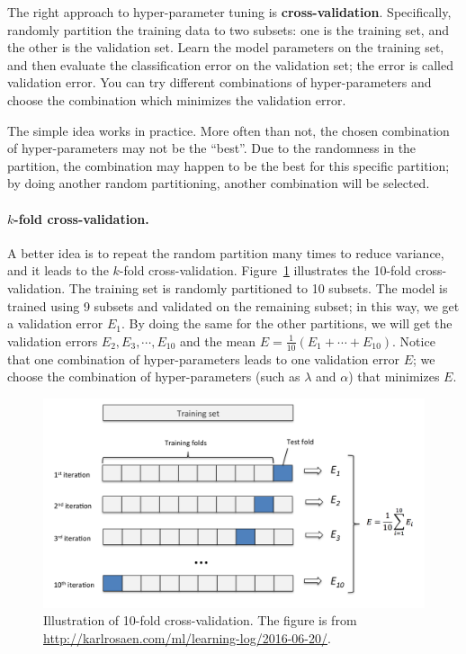 \documentclass[11pt]{article}
\numberwithin{equation}{section}
\begin{document}
The right approach to hyper-parameter tuning is {\bf cross-validation}.
Specifically, randomly partition the training data to two subsets: one is the training set, and the other is the validation set.
Learn the model parameters on the training set, 
and then evaluate the classification error on the validation set;
the error is called validation error.
You can try different combinations of hyper-parameters and choose the combination which minimizes the validation error.



The simple idea works in practice.
More often than not, the chosen combination of hyper-parameters may not be the ``best''.
Due to the randomness in the partition, the combination may happen to be the best for this specific partition;
by doing another random partitioning, another combination will be selected.



\paragraph{$k$-fold cross-validation.}
A better idea is to repeat the random partition many times to reduce variance,
and it leads to the $k$-fold cross-validation.
Figure~\ref{fig:cv} illustrates the 10-fold cross-validation.
The training set is randomly partitioned to 10 subsets.
The model is trained using 9 subsets and validated on the remaining subset;
in this way, we get a validation error $E_1$.
By doing the same for the other partitions, we will get the validation errors $E_2, E_3, \cdots , E_{10}$
and the mean $E = \frac{1}{10} ( E_1 + \cdots + E_{10})$.
Notice that one combination of hyper-parameters leads to one validation error $E$;
we choose the combination of hyper-parameters (such as $\lambda$ and $\alpha$) that minimizes $E$.



\begin{figure}[!h]
	\centering
	\includegraphics[width=0.8\linewidth]{figures/cv.png}
	\caption{Illustration of 10-fold cross-validation.
		The figure is from \url{http://karlrosaen.com/ml/learning-log/2016-06-20/}.}
	\label{fig:cv}
\end{figure}
\end{document}
